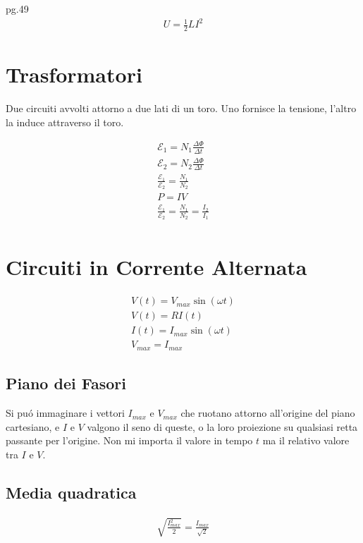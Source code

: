 \documentclass{article}
\begin{document}
\section{}
pg.49
\begin{gather*}
    U=\frac{1}{2}LI^2
\end{gather*}
\section{Trasformatori}

Due circuiti avvolti attorno a due lati di un toro. Uno fornisce la tensione, l'altro la induce attraverso il toro.

\begin{gather*}
    \mathcal{E}_1=N_1\frac{\Delta\Phi}{\Delta t}\\
    \mathcal{E}_2=N_2\frac{\Delta\Phi}{\Delta t}\\
    \frac{\mathcal{E}_1}{\mathcal{E}_2}=\frac{N_1}{N_2}\\
    P=IV\\
    \frac{\mathcal{E}_1}{\mathcal{E}_2}=\frac{N_1}{N_2}=\frac{I_2}{I_1}\\
\end{gather*}
\section{Circuiti in Corrente Alternata}
\begin{gather*}
    V(t)=V_{max}\sin (\omega t)\\
    V(t)=RI(t)\\
    I(t)=I_{max}\sin (\omega t)\\
    V_{max}=I_{max}
\end{gather*}
\subsection{Piano dei Fasori}
Si puó immaginare i vettori $I_{max}$ e $V_{max}$ che ruotano attorno all'origine del piano cartesiano, e $I$ e $V$ valgono il seno di queste, o la loro proiezione su qualsiasi retta passante per l'origine. Non mi importa il valore in tempo $t$ ma il relativo valore tra $I$ e $V$.

\subsection{Media quadratica}
\begin{gather*}
    \sqrt{\frac{I_{max}^2}{2}}=\frac{I_{max}}{\sqrt{2}}
\end{gather*}
\end{document}
